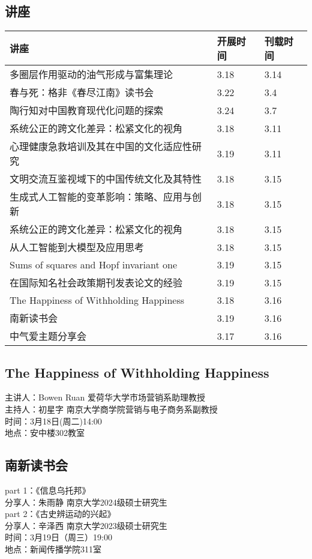 \documentclass[letterpaper, 12pt]{article}
\begin{document}
\begin{multicols}{2}
\pagebreak

\section{讲座}
\begin{tabular}{|>{\centering\arraybackslash}m{}|m{}|m{}|}
    \hline
    讲座 & 开展时间 & 刊载时间\\
    \hline\hline
    多圈层作用驱动的油气形成与富集理论 & 3.18 & 3.14\\\hline
    春与死：格非《春尽江南》读书会 & 3.22 & 3.4\\\hline
    陶行知对中国教育现代化问题的探索 & 3.24 & 3.7\\\hline
    系统公正的跨文化差异：松紧文化的视角 & 3.18 & 3.11\\\hline
    心理健康急救培训及其在中国的文化适应性研究 & 3.19 & 3.11\\\hline
    文明交流互鉴视域下的中国传统文化及其特性 & 3.18 & 3.15\\\hline
    生成式人工智能的变革影响：策略、应用与创新 & 3.18 & 3.15\\\hline
    系统公正的跨文化差异：松紧文化的视角 & 3.18 & 3.15\\\hline
    从人工智能到大模型及应用思考 & 3.18 & 3.15\\\hline
    Sums of squares and Hopf invariant one & 3.19 & 3.15\\\hline
    在国际知名社会政策期刊发表论文的经验 & 3.19 & 3.15\\\hline
    The Happiness of Withholding Happiness & 3.18 & 3.16\\\hline
    南新读书会 & 3.19 & 3.16\\\hline
    中气爱主题分享会 & 3.17 & 3.16\\\hline
\end{tabular}
\subsection{The Happiness of Withholding Happiness}
主讲人：Bowen Ruan 爱荷华大学市场营销系助理教授\\
主持人：初星字 南京大学商学院营销与电子商务系副教授\\
时间：3月18日(周二)14:00\\
地点：安中楼302教室\\

\subsection{南新读书会}
part 1：《信息乌托邦》\\
分享人：朱雨静 南京大学2024级硕士研究生\\
part 2：《古史辨运动的兴起》\\
分享人：辛泽西 南京大学2023级硕士研究生\\
时间：3月19日（周三）19:00\\
地点：新闻传播学院311室\\


\end{multicols}
\end{document}
